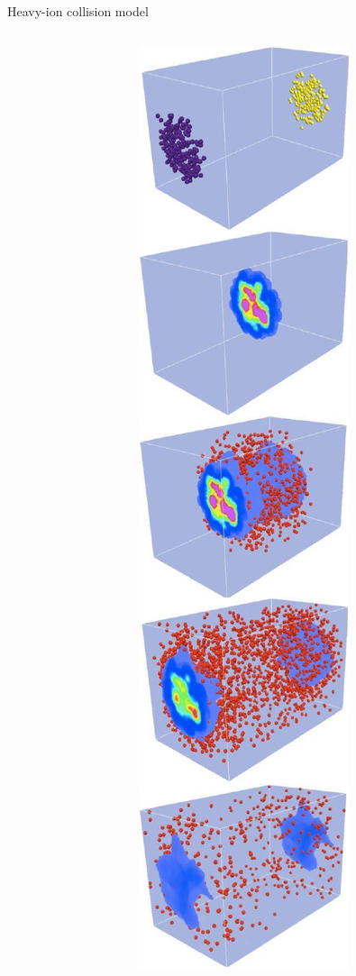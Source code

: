 \documentclass{beamer}
\begin{document}
\begin{frame}{Heavy-ion collision model}
  \smallskip
  \begin{columns}[T]
      \begin{column}{.075\textwidth}
      \end{column}
      \begin{column}{.2\textwidth}
        \centering \medskip
        \includegraphics[height=.75\textheight]{evolution} \\[1ex]

\end{column}
\end{columns}
\end{frame}
\end{document}
